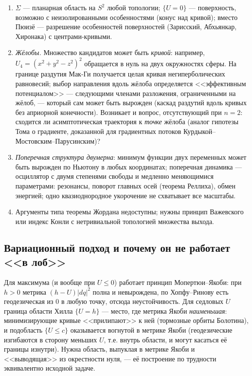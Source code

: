 \documentclass[11pt,a4paper]{article}
\theoremstyle{definition}
\begin{document}
\begin{enumerate}[leftmargin=*,label=(F\arabic*$'$)]
\item $\Sigma$ --- планарная область на $S^2$ любой топологии; $\{U=0\}$ --- поверхность, возможно
с неизолированными особенностями (конус над кривой); вместо Пюизё --- разрешение особенностей
поверхностей (Зарисский, Абхьянкар, Хиронака) с центрами-кривыми.
\item \emph{Жёлобы.} Множество кандидатов может быть \emph{кривой}: например, $U_4=(x^2+y^2-z^2)^2$
обращается в нуль на двух окружностях сферы. На границе раздутия Мак-Ги получается целая кривая
негиперболических равновесий; выбор направления вдоль жёлоба определяется <<эффективным потенциалом>>
--- следующими членами разложения, ограниченными на жёлоб, --- который сам может быть вырожден (каскад
раздутий вдоль кривых без априорной конечности). Возникает и вопрос, отсутствующий при $n=2$: сходится ли
асимптотическая траектория к \emph{точке} жёлоба (аналог гипотезы Тома о градиенте, доказанной для
градиентных потоков Курдыкой--Мостовским--Парусинским)?
\item \emph{Поперечная структура двумерна}: минимум функции двух переменных может быть вырожден по
Ньютону в любых координатах; поперечная динамика --- осциллятор с двумя степенями свободы и медленно
меняющимися параметрами: резонансы, поворот главных осей (теорема Реллиха), обмен энергией; одно
квазиоднородное укорочение не схватывает все масштабы.
\item Аргументы типа теоремы Жордана недоступны; нужны принцип Важевского или индекс Конли с
нетривиальной топологией множества выхода.
\end{enumerate}

\subsection{Вариационный подход и почему он не работает <<в лоб>>}
Для максимума (и вообще при $U\le0$) работает принцип Мопертюи--Якоби: при $h>0$ метрика
$(h-U)|dq|^2$ полна и невырождена, по Хопфу--Ринову есть геодезическая из $0$ в любую точку, отсюда
неустойчивость. Для седловых $U$ граница области Хилла $\{U=h\}$ --- место, где метрика Якоби
\emph{наименьшая}: минимизирующие кривые <<прилипают>> к ней (тормозные орбиты Болотина), и подобласть
$\{U\le c\}$ оказывается вогнутой в метрике Якоби (геодезические изгибаются в сторону меньших $U$,
т.е. внутрь области, и могут касаться её границы изнутри). Нужна область, выпуклая в метрике Якоби и
<<выводящая>> из окрестности нуля, --- её построение по трудности эквивалентно исходной задаче.
\end{document}
